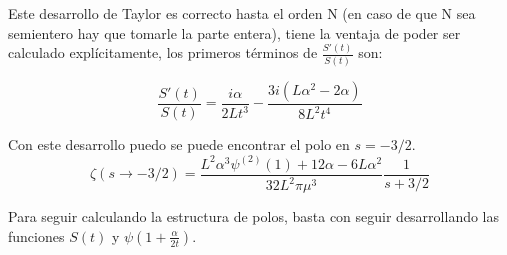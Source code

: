 Este desarrollo de Taylor es correcto hasta el orden N (en caso de que N sea semientero hay que tomarle la parte entera), tiene la ventaja de poder ser calculado explícitamente, los primeros términos de $\frac{S'(t)}{S(t)}$ son:

\begin{equation}
\frac{S'(t)}{S(t)} = 
\frac{i \alpha}{2 L t^3} -
\frac{3 i (L \alpha ^2 - 2 \alpha)}{8 L^2 t ^4}
\end{equation}




Con este desarrollo puedo se puede encontrar el polo en $s=-3/2$.
\begin{equation}
\zeta  (s \rightarrow -3/2) = 
\frac{L ^2 \alpha  ^3 \psi ^{(2)} (1) + 12   \alpha  - 6 L \alpha ^2}{32 L^2 \pi \mu ^3}
\frac{1}{s+3/2}
\end{equation}

Para seguir calculando la estructura de polos, basta con seguir desarrollando las funciones $S(t)$ y $\psi (1 + \frac{\alpha}{2 t})$.

